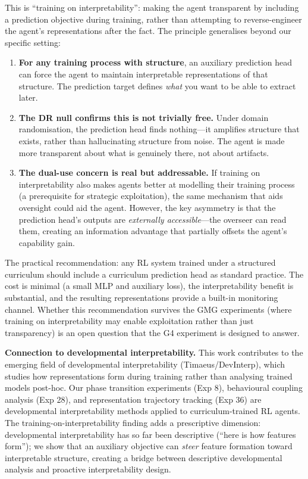 \documentclass[11pt,a4paper]{article}
\theoremstyle{remark}
\begin{document}
This is ``training on interpretability'': making the agent transparent by including a prediction objective during training, rather than attempting to reverse-engineer the agent's representations after the fact. The principle generalises beyond our specific setting:

\begin{enumerate}[nosep]
    \item \textbf{For any training process with structure}, an auxiliary prediction head can force the agent to maintain interpretable representations of that structure. The prediction target defines \textit{what} you want to be able to extract later.
    \item \textbf{The DR null confirms this is not trivially free.} Under domain randomisation, the prediction head finds nothing---it amplifies structure that exists, rather than hallucinating structure from noise. The agent is made more transparent about what is genuinely there, not about artifacts.
    \item \textbf{The dual-use concern is real but addressable.} If training on interpretability also makes agents better at modelling their training process (a prerequisite for strategic exploitation), the same mechanism that aids oversight could aid the agent. However, the key asymmetry is that the prediction head's outputs are \textit{externally accessible}---the overseer can read them, creating an information advantage that partially offsets the agent's capability gain.
\end{enumerate}

The practical recommendation: any RL system trained under a structured curriculum should include a curriculum prediction head as standard practice. The cost is minimal (a small MLP and auxiliary loss), the interpretability benefit is substantial, and the resulting representations provide a built-in monitoring channel. Whether this recommendation survives the GMG experiments (where training on interpretability may enable exploitation rather than just transparency) is an open question that the G4 experiment is designed to answer.

\textbf{Connection to developmental interpretability.} This work contributes to the emerging field of developmental interpretability (Timaeus/DevInterp), which studies how representations form during training rather than analysing trained models post-hoc. Our phase transition experiments (Exp 8), behavioural coupling analysis (Exp 28), and representation trajectory tracking (Exp 36) are developmental interpretability methods applied to curriculum-trained RL agents. The training-on-interpretability finding adds a prescriptive dimension: developmental interpretability has so far been descriptive (``here is how features form''); we show that an auxiliary objective can \textit{steer} feature formation toward interpretable structure, creating a bridge between descriptive developmental analysis and proactive interpretability design.
\end{document}
